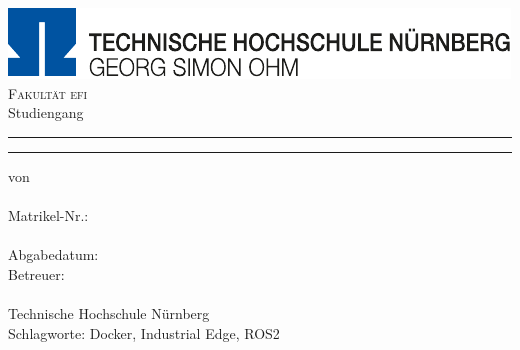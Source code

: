 \newpage
\thispagestyle{empty}
\section*{}
\newpage

\thispagestyle{empty}

\begin{titlepage}
	\begin{center}
		
		\includegraphics[width=\textwidth]{Bilder/TH_Logo.pdf}\\[0.2cm]
		\textsc{\LARGE Fakultät efi}\\[1ex]
		\Large{Studiengang \studiengang}\\
		
		
		\vspace*{40mm}
		\hrule
		\vspace*{5mm}
		\LARGE{\textbf{\titelen}}
		\vspace*{3mm}
		\hrule
		
		\vspace*{15mm}
		\Large{{\art} von}\\
		\LARGE{\textsc{\autor}}\\
		\Large{Matrikel-Nr.: \matrikelnr}\\
		
		
		\vspace*{20mm}		
		\Large{\semester}\\		
		\Large{Abgabedatum: \abgabedatum }\\
		
		\vfill	
		\large{Betreuer:\hfill   \mbox{}}\\
		\large{\erstgutachter \hfill \firmenbetreuerA \mbox{}}\\	
		\large{Technische Hochschule Nürnberg \hfill\firma}\\[2ex]
		
		\large{Schlagworte: Docker, Industrial Edge, ROS2\hfill   \mbox{}}
		
	\end{center}
	
	
\end{titlepage}
\restoregeometry
